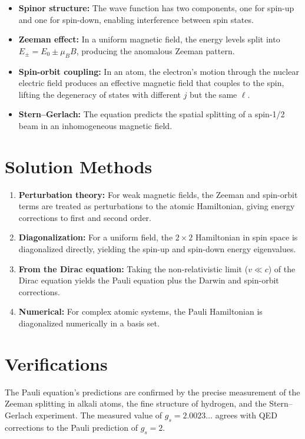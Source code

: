 \documentclass[11pt,openright]{book}
\begin{document}
\begin{itemize}
  \item \textbf{Spinor structure:} The wave function has two components, one for spin-up and one for spin-down, enabling interference between spin states.
  \item \textbf{Zeeman effect:} In a uniform magnetic field, the energy levels split into $E_{\pm} = E_{0} \pm \mu_{B}B$, producing the anomalous Zeeman pattern.
  \item \textbf{Spin-orbit coupling:} In an atom, the electron's motion through the nuclear electric field produces an effective magnetic field that couples to the spin, lifting the degeneracy of states with different $j$ but the same $\ell$.
  \item \textbf{Stern--Gerlach:} The equation predicts the spatial splitting of a spin-1/2 beam in an inhomogeneous magnetic field.
\end{itemize}
\section*{Solution Methods}

\begin{enumerate}
  \item \textbf{Perturbation theory:} For weak magnetic fields, the Zeeman and spin-orbit terms are treated as perturbations to the atomic Hamiltonian, giving energy corrections to first and second order.
  \item \textbf{Diagonalization:} For a uniform field, the $2\times 2$ Hamiltonian in spin space is diagonalized directly, yielding the spin-up and spin-down energy eigenvalues.
  \item \textbf{From the Dirac equation:} Taking the non-relativistic limit ($v \ll c$) of the Dirac equation yields the Pauli equation plus the Darwin and spin-orbit corrections.
  \item \textbf{Numerical:} For complex atomic systems, the Pauli Hamiltonian is diagonalized numerically in a basis set.
\end{enumerate}
\section*{Verifications}

The Pauli equation's predictions are confirmed by the precise measurement of the Zeeman splitting in alkali atoms, the fine structure of hydrogen, and the Stern--Gerlach experiment. The measured value of $g_{s} = 2.0023\ldots$ agrees with QED corrections to the Pauli prediction of $g_{s} = 2$.
\end{document}
